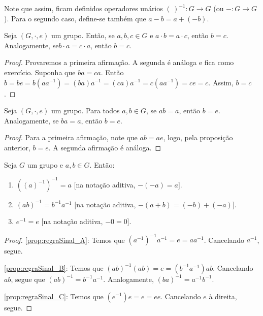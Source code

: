 Note que assim, ficam definidos operadores unários $(\,)^{-1}:G\rightarrow G$ (ou $-:G\rightarrow G$).
Para o segundo caso, define-se também que $a-b=a+(-b)$.

\begin{prop}[Cancelamento]
    Seja $(G,\cdot,e)$ um grupo.
Então, se $a,b,c \in G$ e $a \cdot b = a \cdot c$, então $b=c$.
    Analogamente, se$b \cdot a = c \cdot a$, então $b=c$.
\end{prop}
\begin{proof}
Provaremos a primeira afirmação.
A segunda é análoga e fica como exercício.
    Suponha que $ba=ca$.
Então $b=be=b(aa^{-1})=(ba)a^{-1}=(ca)a^{-1}=c(aa^{-1})=ce=c$.
Assim, $b=c$.
\end{proof}

\begin{corol}[Cancelamento II]
    Seja $(G,\cdot,e)$ um grupo.
    Para todos $a, b \in G$, se $ab=a$, então $b=e$.
Analogamente, se $ba=a$, então $b=e$.
\end{corol}
\begin{proof}
    Para a primeira afirmação, note que $ab=ae$, logo, pela proposição anterior, $b=e$.
    A segunda afirmação é análoga.
\end{proof}

\begin{prop}\label{prop:regraSinal}
    Seja $G$ um grupo e $a, b \in G$.
    Então:
    \begin{enumerate}[label=\alph*)]
        \item $((a)^{-1})^{-1}=a$ [na notação aditiva, $-(-a)=a$].
\label{prop:regraSinal_A}
        \item $(ab)^{-1}=b^{-1}a^{-1}$ [na notação aditiva, $-(a+b)=(-b)+(-a)]$.\label{prop:regraSinal_B}
        \item $e^{-1}=e$ [na notação aditiva, $-0=0$].\label{prop:regraSinal_C}
    \end{enumerate}
\end{prop}
\begin{proof}
    \ref{prop:regraSinal_A}: Temos que $(a^{-1})^{-1}a^{-1}=e=aa^{-1}$.
    Cancelando $a^{-1}$, segue.
    
    \ref{prop:regraSinal_B}: Temos que $(ab)^{-1}(ab)=e=(b^{-1}a^{-1})ab$.
    Cancelando $ab$, segue que $(ab)^{-1}=b^{-1}a^{-1}$.
    Analogamente, $(ba)^{-1}=a^{-1}b^{-1}$.

    \ref{prop:regraSinal_C}: Temos que $(e^{-1})e=e=ee$.
    Cancelando $e$ à direita, segue.


\end{proof}

